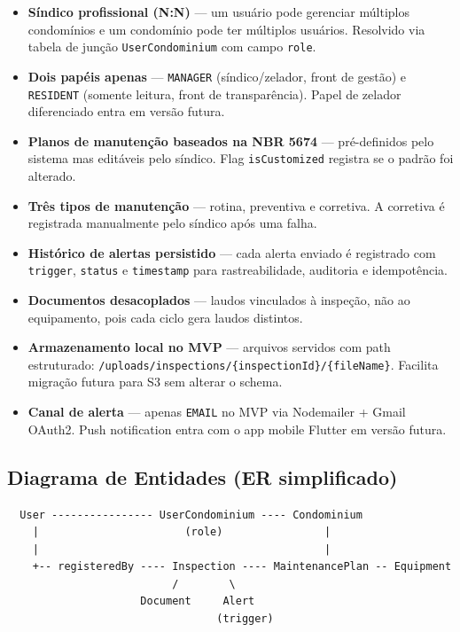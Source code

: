 \documentclass[12pt, a4paper]{article}
\begin{document}
\begin{itemize}[leftmargin=1.5em]
    \item \textbf{Síndico profissional (N:N)} — um usuário pode gerenciar múltiplos condomínios
    e um condomínio pode ter múltiplos usuários. Resolvido via tabela de junção
    \texttt{UserCondominium} com campo \texttt{role}.
    \item \textbf{Dois papéis apenas} — \texttt{MANAGER} (síndico/zelador, front de gestão)
    e \texttt{RESIDENT} (somente leitura, front de transparência). Papel de zelador
    diferenciado entra em versão futura.
    \item \textbf{Planos de manutenção baseados na NBR 5674} — pré-definidos pelo sistema
    mas editáveis pelo síndico. Flag \texttt{isCustomized} registra se o padrão foi alterado.
    \item \textbf{Três tipos de manutenção} — rotina, preventiva e corretiva. A corretiva
    é registrada manualmente pelo síndico após uma falha.
    \item \textbf{Histórico de alertas persistido} — cada alerta enviado é registrado com
    \texttt{trigger}, \texttt{status} e \texttt{timestamp} para rastreabilidade, auditoria
    e idempotência.
    \item \textbf{Documentos desacoplados} — laudos vinculados à inspeção, não ao equipamento,
    pois cada ciclo gera laudos distintos.
    \item \textbf{Armazenamento local no MVP} — arquivos servidos com path estruturado:
    \texttt{/uploads/inspections/\{inspectionId\}/\{fileName\}}.
    Facilita migração futura para S3 sem alterar o schema.
    \item \textbf{Canal de alerta} — apenas \texttt{EMAIL} no MVP via Nodemailer + Gmail OAuth2.
    Push notification entra com o app mobile Flutter em versão futura.
\end{itemize}

\subsection{Diagrama de Entidades (ER simplificado)}

\begin{verbatim}
  User ---------------- UserCondominium ---- Condominium
    |                       (role)                |
    |                                             |
    +-- registeredBy ---- Inspection ---- MaintenancePlan -- Equipment
                          /        \
                     Document     Alert
                                 (trigger)
\end{verbatim}
\end{document}
